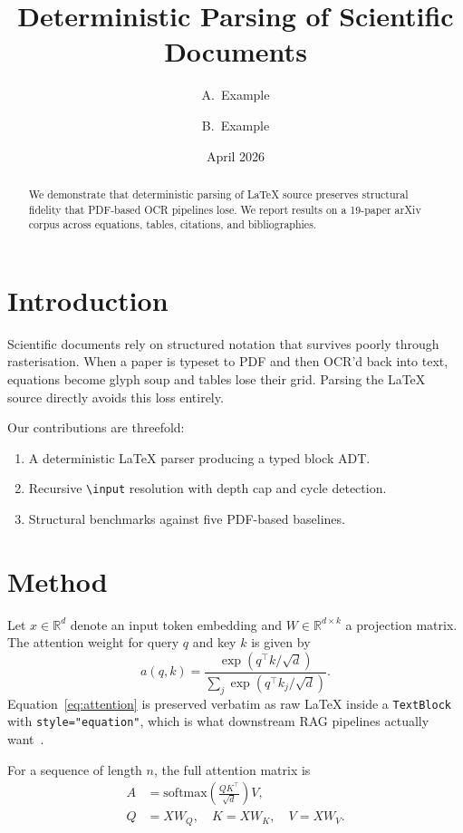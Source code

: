 \documentclass{article}
\title{Deterministic Parsing of Scientific Documents}
\author{A.\ Example \and B.\ Example}
\date{April 2026}
\begin{document}
\maketitle

\begin{abstract}
We demonstrate that deterministic parsing of LaTeX source preserves
structural fidelity that PDF-based OCR pipelines lose. We report
results on a 19-paper arXiv corpus across equations, tables,
citations, and bibliographies.
\end{abstract}

\section{Introduction}
\label{sec:intro}

Scientific documents rely on structured notation that survives poorly
through rasterisation. When a paper is typeset to PDF and then OCR'd
back into text, equations become glyph soup and tables lose their
grid. Parsing the LaTeX source directly avoids this loss entirely.

Our contributions are threefold:
\begin{enumerate}
  \item A deterministic LaTeX parser producing a typed block ADT.
  \item Recursive \texttt{\textbackslash input} resolution with
        depth cap and cycle detection.
  \item Structural benchmarks against five PDF-based baselines.
\end{enumerate}

\section{Method}

Let $x \in \mathbb{R}^d$ denote an input token embedding and
$W \in \mathbb{R}^{d \times k}$ a projection matrix. The attention
weight for query $q$ and key $k$ is given by
\begin{equation}
  \label{eq:attention}
  a(q, k) = \frac{\exp(q^\top k / \sqrt{d})}{\sum_{j} \exp(q^\top k_j / \sqrt{d})}.
\end{equation}
Equation~\eqref{eq:attention} is preserved verbatim as raw LaTeX
inside a \texttt{TextBlock} with \texttt{style="equation"}, which is
what downstream RAG pipelines actually want~\cite{vaswani2017}.

For a sequence of length $n$, the full attention matrix is
\begin{align}
  A &= \mathrm{softmax}\!\left(\frac{QK^\top}{\sqrt{d}}\right) V, \\
  Q &= XW_Q, \quad K = XW_K, \quad V = XW_V.
\end{align}
\end{document}
